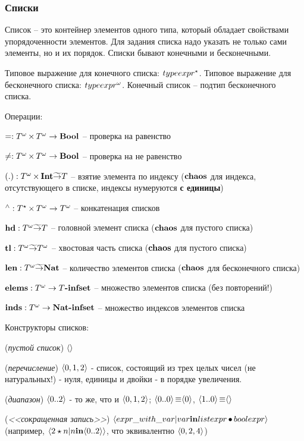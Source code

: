 \documentclass[14pt, twoside]{extreport}
\newcommand{\head}[1]{\vspace{1cm}\subsubsection*{#1}}
\begin{document}
\head{Списки}
Список -- это контейнер элементов одного типа, который обладает свойствами упорядоченности элементов. Для задания списка надо указать не только сами элементы, но и их порядок. Списки бывают конечными и бесконечными.

Типовое выражение для конечного списка: $typeexpr^{\star}$. Типовое выражение для бесконечного списка: $typeexpr^{\omega}$. Конечный список -- подтип бесконечного списка.

Операции:
\begin{list}{}{}
\item $=: T^{\omega} \mathop{\times} T^{\omega} \rightarrow \textbf{Bool}$ -- проверка на равенство
\item $\neq: T^{\omega} \mathop{\times} T^{\omega} \rightarrow \textbf{Bool}$ -- проверка на не равенство
\item $(.) : T^{\omega} \mathop{\times} \textbf{Int} \widetilde{\rightarrow} T$ -- взятие элемента по
индексу ($\textbf{chaos}$ для индекса, отсутствующего в списке, индексы
нумеруются \textbf{с единицы})
\item $\mathop{{ }^\wedge}: T^{\star} \mathop{\times} T^{\omega} \rightarrow T^{\omega}$ -- конкатенация списков
\item $\mathop{\textbf{hd}}: T^{\omega} \widetilde{\rightarrow} T$ -- головной элемент списка ($\textbf{chaos}$ для пустого списка)
\item $\mathop{\textbf{tl}}: T^{\omega} \widetilde{\rightarrow} T^{\omega}$ -- хвостовая часть списка ($\textbf{chaos}$ для пустого списка)
\item $\mathop{\textbf{len}}: T^{\omega} \widetilde{\rightarrow} \textbf{Nat}$ -- количество элементов списка ($\textbf{chaos}$ для бесконечного списка)
\item $\mathop{\textbf{elems}}: T^{\omega} \rightarrow T\textbf{-infset}$ -- множество элементов списка (без повторений!)
\item $\mathop{\textbf{inds}}: T^{\omega} \rightarrow \textbf{Nat}\textbf{-infset}$ -- множество индексов элементов списка
\end{list}

Конструкторы списков:
\begin{list}{}{}
\item (\emph{пустой список}) $\langle\rangle$
\item (\emph{перечисление}) $\langle 0, 1, 2 \rangle$ - список, состоящий из трех целых чисел (не натуральных!) - нуля, единицы и двойки - в порядке увеличения.
\item (\emph{диапазон}) $\langle 0..2 \rangle$ -  то же, что и $\langle 0, 1, 2 \rangle$; $\langle 0..0 \rangle \mathop{\equiv} \langle 0 \rangle$, $\langle 1..0 \rangle \mathop{\equiv} \langle\rangle$
\item (\emph{<<сокращенная запись>>}) $\langle expr\_with\_var | var \textbf{in} listexpr \mathop{\bullet} boolexpr\rangle$ (например, $\langle 2 \star n | n \textbf{in} \langle 0..2 \rangle \rangle$, что эквивалентно $\langle 0, 2, 4 \rangle$)
\end{list}
\end{document}
